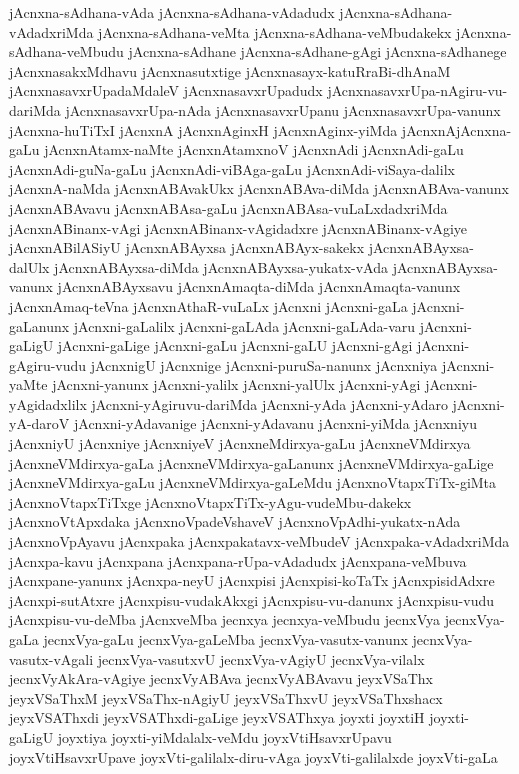 {jAcnxna-sAdhana-vAda
jAcnxna-sAdhana-vAdadudx
jAcnxna-sAdhana-vAdadxriMda
jAcnxna-sAdhana-veMta
jAcnxna-sAdhana-veMbudakekx
jAcnxna-sAdhana-veMbudu
jAcnxna-sAdhane
jAcnxna-sAdhane-gAgi
jAcnxna-sAdhanege
jAcnxnasakxMdhavu
jAcnxnasutxtige
jAcnxnasayx-katuRraBi-dhAnaM
jAcnxnasavxrUpadaMdaleV
jAcnxnasavxrUpadudx
jAcnxnasavxrUpa-nAgiru-vu-dariMda
jAcnxnasavxrUpa-nAda
jAcnxnasavxrUpanu
jAcnxnasavxrUpa-vanunx
jAcnxna-huTiTxI
jAcnxnA
jAcnxnAginxH
jAcnxnAginx-yiMda
jAcnxnAjAcnxna-gaLu
jAcnxnAtamx-naMte
jAcnxnAtamxnoV
jAcnxnAdi
jAcnxnAdi-gaLu
jAcnxnAdi-guNa-gaLu
jAcnxnAdi-viBAga-gaLu
jAcnxnAdi-viSaya-dalilx
jAcnxnA-naMda
jAcnxnABAvakUkx
jAcnxnABAva-diMda
jAcnxnABAva-vanunx
jAcnxnABAvavu
jAcnxnABAsa-gaLu
jAcnxnABAsa-vuLaLxdadxriMda
jAcnxnABinanx-vAgi
jAcnxnABinanx-vAgidadxre
jAcnxnABinanx-vAgiye
jAcnxnABilASiyU
jAcnxnABAyxsa
jAcnxnABAyx-sakekx
jAcnxnABAyxsa-dalUlx
jAcnxnABAyxsa-diMda
jAcnxnABAyxsa-yukatx-vAda
jAcnxnABAyxsa-vanunx
jAcnxnABAyxsavu
jAcnxnAmaqta-diMda
jAcnxnAmaqta-vanunx
jAcnxnAmaq-teVna
jAcnxnAthaR-vuLaLx
jAcnxni
jAcnxni-gaLa
jAcnxni-gaLanunx
jAcnxni-gaLalilx
jAcnxni-gaLAda
jAcnxni-gaLAda-varu
jAcnxni-gaLigU
jAcnxni-gaLige
jAcnxni-gaLu
jAcnxni-gaLU
jAcnxni-gAgi
jAcnxni-gAgiru-vudu
jAcnxnigU
jAcnxnige
jAcnxni-puruSa-nanunx
jAcnxniya
jAcnxni-yaMte
jAcnxni-yanunx
jAcnxni-yalilx
jAcnxni-yalUlx
jAcnxni-yAgi
jAcnxni-yAgidadxlilx
jAcnxni-yAgiruvu-dariMda
jAcnxni-yAda
jAcnxni-yAdaro
jAcnxni-yA-daroV
jAcnxni-yAdavanige
jAcnxni-yAdavanu
jAcnxni-yiMda
jAcnxniyu
jAcnxniyU
jAcnxniye
jAcnxniyeV
jAcnxneMdirxya-gaLu
jAcnxneVMdirxya
jAcnxneVMdirxya-gaLa
jAcnxneVMdirxya-gaLanunx
jAcnxneVMdirxya-gaLige
jAcnxneVMdirxya-gaLu
jAcnxneVMdirxya-gaLeMdu
jAcnxnoVtapxTiTx-giMta
jAcnxnoVtapxTiTxge
jAcnxnoVtapxTiTx-yAgu-vudeMbu-dakekx
jAcnxnoVtApxdaka
jAcnxnoVpadeVshaveV
jAcnxnoVpAdhi-yukatx-nAda
jAcnxnoVpAyavu
jAcnxpaka
jAcnxpakatavx-veMbudeV
jAcnxpaka-vAdadxriMda
jAcnxpa-kavu
jAcnxpana
jAcnxpana-rUpa-vAdadudx
jAcnxpana-veMbuva
jAcnxpane-yanunx
jAcnxpa-neyU
jAcnxpisi
jAcnxpisi-koTaTx
jAcnxpisidAdxre
jAcnxpi-sutAtxre
jAcnxpisu-vudakAkxgi
jAcnxpisu-vu-danunx
jAcnxpisu-vudu
jAcnxpisu-vu-deMba
jAcnxveMba
jecnxya
jecnxya-veMbudu
jecnxVya
jecnxVya-gaLa
jecnxVya-gaLu
jecnxVya-gaLeMba
jecnxVya-vasutx-vanunx
jecnxVya-vasutx-vAgali
jecnxVya-vasutxvU
jecnxVya-vAgiyU
jecnxVya-vilalx
jecnxVyAkAra-vAgiye
jecnxVyABAva
jecnxVyABAvavu
jeyxVSaThx
jeyxVSaThxM
jeyxVSaThx-nAgiyU
jeyxVSaThxvU
jeyxVSaThxshacx
jeyxVSAThxdi
jeyxVSAThxdi-gaLige
jeyxVSAThxya
joyxti
joyxtiH
joyxti-gaLigU
joyxtiya
joyxti-yiMdalalx-veMdu
joyxVtiHsavxrUpavu
joyxVtiHsavxrUpave
joyxVti-galilalx-diru-vAga
joyxVti-galilalxde
joyxVti-gaLa
}
